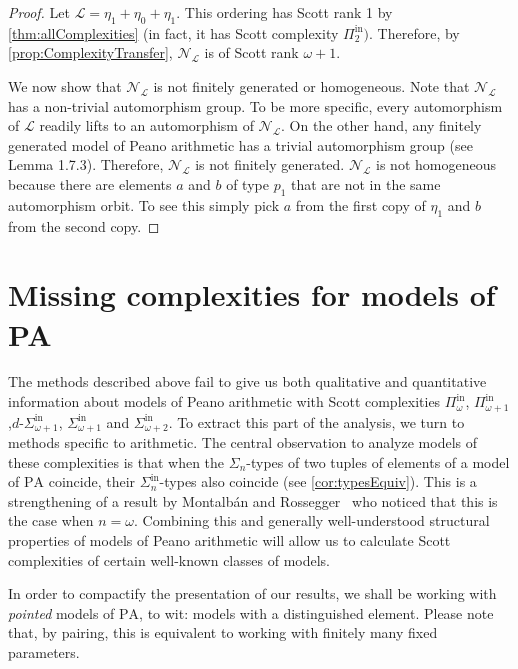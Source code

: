 \documentclass[11pt]{amsart}
\newcommand{\N}{\mathcal{N}}
\newcommand{\mc}[1]{\mathcal{#1}}
\newcommand{\Pinf}[1]{\Pi^{\mathrm{in}}_{#1}}
\newcommand{\Sinf}[1]{\Sigma^{\mathrm{in}}_{#1}}
\newcommand{\dSinf}[1]{d\text{-}\Sigma^{\mathrm{in}}_{#1}}
\newcommand{\PA}{\mathrm{PA}}
\def\N{{\mathcal N}}
\theoremstyle{remark}
\begin{document}
\begin{proof}
    Let $\mc{L}=\eta_1+\eta_0+\eta_1$. This ordering has Scott rank 1 by \cref{thm:allComplexities} (in fact, it has Scott complexity $\Pinf{2})$.
    Therefore, by \cref{prop:ComplexityTransfer}, $\N_\mc{L}$ is of Scott rank $\omega+1$.

    We now show that $\N_\mc{L}$ is not finitely generated or homogeneous.
    Note that $\N_\mc{L}$ has a non-trivial automorphism group.
    To be more specific, every automorphism of $\mc{L}$ readily lifts to an automorphism of $\N_\mc{L}$.
    On the other hand, any finitely generated model of Peano arithmetic has a trivial automorphism group (see \cite{KS} Lemma 1.7.3).
    Therefore, $\N_\mc{L}$ is not finitely generated.
    $\N_\mc{L}$ is not homogeneous because there are elements $a$ and $b$ of type $p_1$ that are not in the same automorphism orbit. To see this simply pick $a$ from the first copy of $\eta_1$ and $b$ from the second copy.

\end{proof}




	\section{Missing complexities for models of PA}\label{sec:missing}
The methods described above fail to give us both qualitative and quantitative information about models of Peano arithmetic with Scott complexities $\Pinf\omega$, $\Pinf{\omega+1}$,$\dSinf{\omega+1}$, $\Sinf{\omega+1}$ and $\Sinf{\omega+2}$. To extract this part of the analysis, we turn to methods specific to arithmetic.
The central observation to analyze models of these complexities is that when the $\Sigma_n$-types of two tuples of elements of a model of $\PA$ coincide, their $\Sinf{n}$-types also coincide (see \cref{cor:typesEquiv}). This is a strengthening of a result by Montalbán and Rossegger~\cite[Lemma 5]{MR23} who noticed that this is the case when $n=\omega$. Combining this and generally well-understood structural properties of models of Peano arithmetic will allow us to calculate Scott complexities of certain well-known classes of models. 

In order to compactify the presentation of our results, we shall be working with \textit{pointed} models of $\PA$, to wit: models with a distinguished element. Please note that, by pairing, this is equivalent to working with finitely many fixed parameters.
\end{document}
